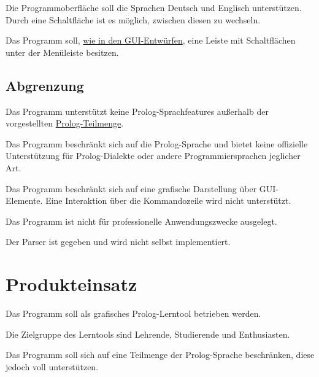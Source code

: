 \documentclass[parskip=full,11pt,twoside]{scrartcl}
\begin{document}

Die Programmoberfläche soll die Sprachen Deutsch und Englisch unterstützen. Durch eine Schaltfläche ist es möglich, zwischen diesen zu wechseln.


Das Programm soll, \hyperref[gui:schnellzugriff]{wie in den GUI-Entwürfen}, eine Leiste mit Schaltflächen unter der Menüleiste besitzen.

\newpage
\subsection{Abgrenzung}


Das Programm unterstützt keine Prolog-Sprachfeatures außerhalb der vorgestellten \hyperref[glossary]{Prolog-Teilmenge}.


Das Programm beschränkt sich auf die Prolog-Sprache und bietet keine offizielle Unterstützung für Prolog-Dialekte oder andere Programmiersprachen jeglicher Art.


Das Programm beschränkt sich auf eine grafische Darstellung über GUI-Elemente. Eine Interaktion über die Kommandozeile wird nicht unterstützt.


Das Programm ist nicht für professionelle Anwendungszwecke ausgelegt.


Der Parser ist gegeben und wird nicht selbst implementiert.

\section{Produkteinsatz}

Das Programm soll als grafisches Prolog-Lerntool betrieben werden.

Die Zielgruppe des Lerntools sind Lehrende, Studierende und Enthusiasten.

Das Programm soll sich auf eine Teilmenge der Prolog-Sprache beschränken, diese jedoch voll unterstützen.
\end{document}
